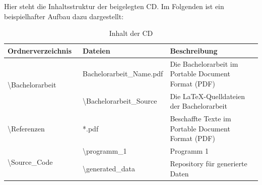 \documentclass[a4paper,12pt,bibliography=totoc]{scrreprt}
\newcounter{savepage}
\begin{document}
\newpage
{}
\setcounter{page}{\thesavepage}







\newpage
{}
\label{anhang}

Hier steht die Inhaltsstruktur der beigelegten CD. Im Folgenden ist ein beispielhafter Aufbau dazu dargestellt:

\begin{table}[h]
	\begin{tabular}{|p{0.3\linewidth}|p{0.3\linewidth}|p{0.4\linewidth}|}
		\hline
		Ordnerverzeichnis                               & Dateien                                & Beschreibung                                         \\ \hline
		\multirow{2}{*}{\textbackslash{}Bachelorarbeit} & Bachelorarbeit\_Name.pdf               & Die Bachelorarbeit im Portable Document Format (PDF) \\
		                                                & \textbackslash{}Bachelorarbeit\_Source & Die LaTeX-Quelldateien der Bachelorarbeit            \\ \hline
		\textbackslash{}Referenzen                      & *.pdf                                  & Beschaffte Texte im Portable Document Format (PDF)   \\ \hline
		\multirow{2}{*}{\textbackslash{}Source\_Code}   & \textbackslash{}programm\_1            & Programm 1                                           \\
		                                                & \textbackslash{}generated\_data        & Repository für generierte Daten                      \\\hline
	\end{tabular}
	\label{tab:anhang-inhalt-cd}
	\caption{Inhalt der CD}
\end{table}


\end{document}
